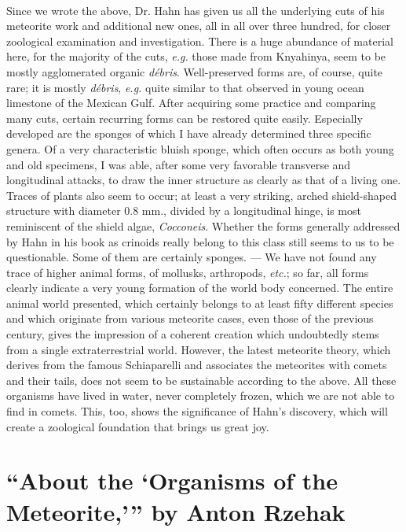 \documentclass[a4paper, 12pt, oneside]{article}
\begin{document}
\paragraph*{}
Since we wrote the above, Dr. Hahn has given us all the underlying cuts of his meteorite work and additional new ones, all in all over three hundred, for closer zoological examination and investigation. There is a huge abundance of material here, for the majority of the cuts, \emph{e.g.} those made from Knyahinya, seem to be mostly agglomerated organic \emph{débris}. Well-preserved forms are, of course, quite rare; it is mostly \emph{débris}, \emph{e.g.} quite similar to that observed in young ocean limestone of the Mexican Gulf. After acquiring some practice and comparing many cuts, certain recurring forms can be restored quite easily. Especially developed are the sponges of which I have already determined three specific genera. Of a very characteristic bluish sponge, which often occurs as both young and old specimens, I was able, after some very favorable transverse and longitudinal attacks, to draw the inner structure as clearly as that of a living one. Traces of plants also seem to occur; at least a very striking, arched shield-shaped structure with diameter 0.8 mm., divided by a longitudinal hinge, is most reminiscent of the shield algae, \emph{Cocconeis}. Whether the forms generally addressed by Hahn in his book as crinoids really belong to this class still seems to us to be questionable. Some of them are certainly sponges. --- We have not found any trace of higher animal forms, of mollusks, arthropods, \emph{etc.}; so far, all forms clearly indicate a very young formation of the world body concerned. The entire animal world presented, which certainly belongs to at least fifty different species and which originate from various meteorite cases, even those of the previous century, gives the impression of a coherent creation which undoubtedly stems from a single extraterrestrial world. However, the latest meteorite theory, which derives from the famous Schiaparelli and associates the meteorites with comets and their tails, does not seem to be sustainable according to the above. All these organisms have lived in water, never completely frozen, which we are not able to find in comets. This, too, shows the significance of Hahn's discovery, which will create a zoological foundation that brings us great joy.
\clearpage
\section{``About the `Organisms of the Meteorite,''' by Anton Rzehak}
\end{document}
